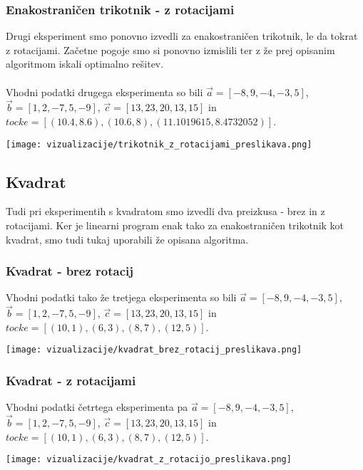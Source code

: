 \documentclass[a4paper, 12pt]{article}
\begin{document}
\subsubsection{Enakostraničen trikotnik - z rotacijami}
Drugi eksperiment smo ponovno izvedli za enakostraničen trikotnik, le da tokrat z rotacijami. Začetne pogoje smo si ponovno izmislili ter z že prej opisanim algoritmom
iskali optimalno rešitev. 
\\~\\
Vhodni podatki drugega eksperimenta so bili $\vec{a}=[-8,9,-4,-3,5]$, $\vec{b}=[1,2,-7,5,-9]$, $\vec{c}=[13,23,20,13,15]$ in $tocke = [(10.4,8.6),(10.6,8),(11.1019615,8.4732052)]$.
\begin{center}
    \texttt{[image: vizualizacije/trikotnik\_z\_rotacijami\_preslikava.png]}\\
\end{center}

\subsection{Kvadrat}
Tudi pri eksperimentih s kvadratom smo izvedli dva preizkusa - brez in z rotacijami. Ker je linearni program enak tako za enakostraničen trikotnik kot kvadrat,
smo tudi tukaj uporabili že opisana algoritma.
 
\subsubsection{Kvadrat - brez rotacij}
Vhodni podatki tako že tretjega eksperimenta so bili $\vec{a}=[-8,9,-4,-3,5]$, $\vec{b}=[1,2,-7,5,-9]$, $\vec{c}=[13,23,20,13,15]$ in $tocke = [(10,1),(6,3), (8,7),(12,5)]$.
\begin{center}
    \texttt{[image: vizualizacije/kvadrat\_brez\_rotacij\_preslikava.png]}\\
\end{center}
\subsubsection{Kvadrat - z rotacijami}
Vhodni podatki četrtega eksperimenta pa $\vec{a}=[-8,9,-4,-3,5]$, $\vec{b}=[1,2,-7,5,-9]$, $\vec{c}=[13,23,20,13,15]$ in $tocke = [(10,1),(6,3), (8,7),(12,5)]$.
\begin{center}
    \texttt{[image: vizualizacije/kvadrat\_z\_rotacijo\_preslikava.png]}\\
\end{center}
\end{document}
